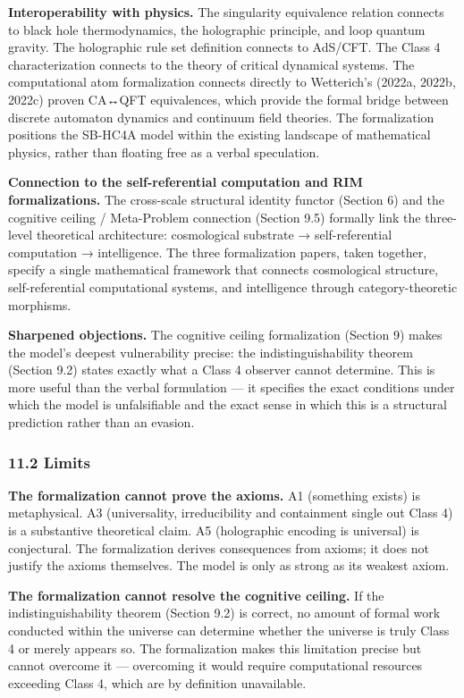 \documentclass[
]{article}
\begin{document}
\textbf{Interoperability with physics.} The singularity equivalence
relation connects to black hole thermodynamics, the holographic
principle, and loop quantum gravity. The holographic rule set definition
connects to AdS/CFT. The Class 4 characterization connects to the theory
of critical dynamical systems. The computational atom formalization
connects directly to Wetterich's (2022a, 2022b, 2022c) proven CA↔QFT
equivalences, which provide the formal bridge between discrete automaton
dynamics and continuum field theories. The formalization positions the
SB-HC4A model within the existing landscape of mathematical physics,
rather than floating free as a verbal speculation.

\textbf{Connection to the self-referential computation and RIM
formalizations.} The cross-scale structural identity functor (Section 6)
and the cognitive ceiling / Meta-Problem connection (Section 9.5)
formally link the three-level theoretical architecture: cosmological
substrate → self-referential computation → intelligence. The three
formalization papers, taken together, specify a single mathematical
framework that connects cosmological structure, self-referential
computational systems, and intelligence through category-theoretic
morphisms.

\textbf{Sharpened objections.} The cognitive ceiling formalization
(Section 9) makes the model's deepest vulnerability precise: the
indistinguishability theorem (Section 9.2) states exactly what a Class 4
observer cannot determine. This is more useful than the verbal
formulation --- it specifies the exact conditions under which the model
is unfalsifiable and the exact sense in which this is a structural
prediction rather than an evasion.

\hypertarget{limits}{%
\subsubsection{11.2 Limits}\label{limits}}

\textbf{The formalization cannot prove the axioms.} A1 (something
exists) is metaphysical. A3 (universality, irreducibility and
containment single out Class 4) is a substantive theoretical claim. A5
(holographic encoding is universal) is conjectural. The formalization
derives consequences from axioms; it does not justify the axioms
themselves. The model is only as strong as its weakest axiom.

\textbf{The formalization cannot resolve the cognitive ceiling.} If the
indistinguishability theorem (Section 9.2) is correct, no amount of
formal work conducted within the universe can determine whether the
universe is truly Class 4 or merely appears so. The formalization makes
this limitation precise but cannot overcome it --- overcoming it would
require computational resources exceeding Class 4, which are by
definition unavailable.
\end{document}
